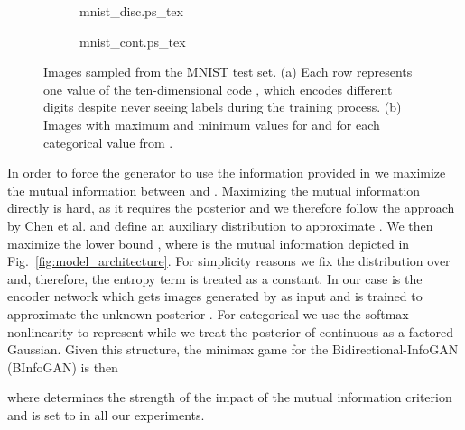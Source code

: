 \documentclass{esannV2}
\begin{document}
\begin{figure}
\centering
\begin{subfigure}[b]{0.8\textwidth}
\begin{footnotesize}
\def\svgwidth{\linewidth}
\def\svgscale{0.5}
{mnist_disc.ps_tex}
\end{footnotesize}
\vspace{-0.6cm}
\caption{}
\label{fig:mnist:discrete}
\end{subfigure}

\begin{subfigure}[b]{0.8\textwidth}
\begin{footnotesize}
\def\svgwidth{\linewidth}
\def\svgscale{0.5}
{mnist_cont.ps_tex}
\end{footnotesize}
\vspace{-0.4cm}
\caption{}
\label{fig:mnist:continuous}
\end{subfigure}

\caption{Images sampled from the MNIST test set. (a) Each row represents one value of the ten-dimensional code , which encodes different digits despite never seeing labels during the training process. (b) Images with maximum and minimum values for  and  for each categorical value from .}
\vspace{-0.3cm}
\label{fig:mnist}
\end{figure}

In order to force the generator to use the information provided in  we maximize the mutual information  between  and . Maximizing the mutual information directly is hard, as it requires the posterior  and we therefore follow the approach by Chen et al. \cite{Chen2016} and define an auxiliary distribution  to approximate . We then maximize the lower bound , where  is the mutual information depicted in Fig.~\ref{fig:model_architecture}. For simplicity reasons we fix the distribution over  and, therefore, the entropy term  is treated as a constant. In our case  is the encoder network which gets images generated by  as input and is trained to approximate the unknown posterior . For categorical  we use the softmax nonlinearity to represent  while we treat the posterior  of continuous  as a factored Gaussian. Given this structure, the minimax game for the Bidirectional-InfoGAN (BInfoGAN) is then

where  determines the strength of the impact of the mutual information criterion  and is set to  in all our experiments.
\end{document}
